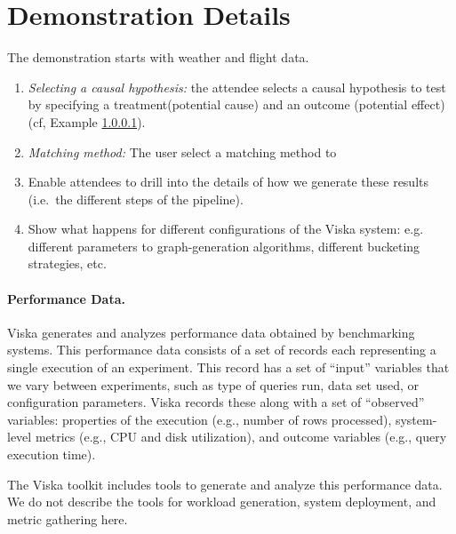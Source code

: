 \section{Demonstration Details}

The demonstration starts with weather and flight data.   

\begin{enumerate}
\item {\it Selecting a causal hypothesis:} the attendee selects a causal hypothesis to test by 
specifying a treatment(potential cause) and an outcome (potential effect) (cf, Example \ref{}).  

\item {\it Matching method:} The user select a matching method to 
\item Enable attendees to drill into the details of how we generate these
results (i.e.\, the different steps of the pipeline).
\item Show what happens for different configurations of the Viska system:
e.g.\, different parameters to graph-generation algorithms, different bucketing
strategies, etc.
\end{enumerate}

\paragraph{Performance Data.}

Viska generates and analyzes performance data obtained by benchmarking
systems. This performance data consists of a set of records
each representing a single execution of an experiment. This record has
a set of ``input'' variables that we vary between experiments, such as
type of queries run, data set used, or configuration parameters. Viska
records these along with a set of ``observed'' variables: properties
of the execution (e.g., number of rows processed), system-level
metrics (e.g., CPU and disk utilization), and outcome variables (e.g.,
query execution time).

The Viska toolkit includes tools to generate and analyze this
performance data. We do not describe the tools for workload
generation, system deployment, and metric gathering here.
